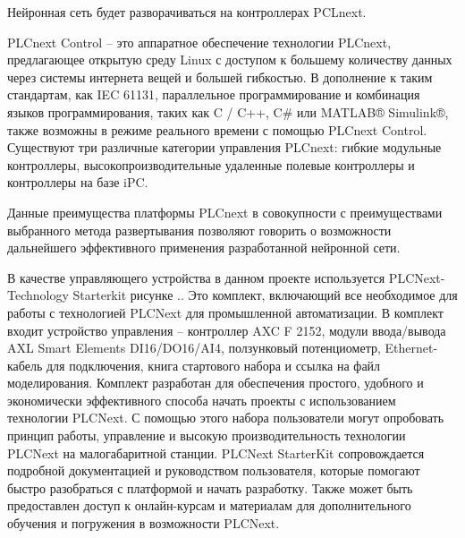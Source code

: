 {\gostFont

	\par \redline Нейронная сеть будет разворачиваться на контроллерах PCLnext.

	\par \redline PLCnext Control {--} это аппаратное обеспечение технологии PLCnext, предлагающее открытую среду Linux с доступом к большему количеству данных через системы интернета вещей и большей гибкостью. В дополнение к таким стандартам, как IEC 61131, параллельное программирование и комбинация языков программирования, таких как C / C++, C\# или MATLAB® Simulink®, также возможны в режиме реального времени с помощью PLCnext Control. Существуют три различные категории управления PLCnext: гибкие модульные контроллеры, высокопроизводительные удаленные полевые контроллеры и контроллеры на базе iPC.

	\par \redline Данные преимущества платформы PLCnext в совокупности с преимуществами выбранного метода развертывания позволяют говорить о возможности дальнейшего эффективного применения разработанной нейронной сети.

	\par \redline В качестве управляющего устройства в данном проекте используется PLCNext-Technology Starterkit  рисунке \thechaptercntr.\theimagecntr. Это комплект, включающий все необходимое для работы с технологией PLCNext для промышленной автоматизации. В комплект входит устройство управления {--} контроллер AXC F 2152, модули ввода/вывода AXL Smart Elements DI16/DO16/AI4, ползунковый потенциометр, Ethernet-кабель для подключения, книга стартового набора и ссылка на файл моделирования. Комплект разработан для обеспечения простого, удобного и экономически эффективного способа начать проекты с использованием технологии PLCNext. С помощью этого набора пользователи могут опробовать принцип работы, управление и высокую производительность технологии PLCNext на малогабаритной станции. PLCNext StarterKit сопровождается подробной документацией и руководством пользователя, которые помогают быстро разобраться с платформой и начать разработку. Также может быть предоставлен доступ к онлайн-курсам и материалам для дополнительного обучения и погружения в возможности PLCNext.

}
